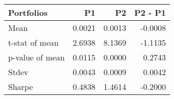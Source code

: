 \begin{tabular}{lrrr}
\toprule
Portfolios & P1 & P2 & P2 - P1 \\
\midrule
Mean & 0.0021 & 0.0013 & -0.0008 \\
t-stat of mean & 2.6938 & 8.1369 & -1.1135 \\
p-value of mean & 0.0115 & 0.0000 & 0.2743 \\
Stdev & 0.0043 & 0.0009 & 0.0042 \\
Sharpe & 0.4838 & 1.4614 & -0.2000 \\
\bottomrule
\end{tabular}
